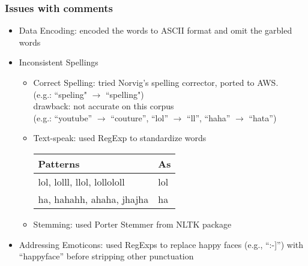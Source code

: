 \documentclass[fleqn]{beamer}
\begin{document}
\begin{frame}
\frametitle{Issues with comments}
    \begin{itemize}
   	\item Data Encoding: encoded the words to ASCII format and omit the garbled words
        \item Inconsistent Spellings 
        	\begin{itemize}
		\item Correct Spelling: tried Norvig's spelling corrector, ported to AWS. \\
		(e.g.: ``speling"  $\rightarrow$ ``spelling")\\
                drawback: not accurate on this corpus\\
                  (e.g.: ``youtube'' $\rightarrow$ ``couture'', 
                    ``lol'' $\rightarrow$ ``ll'', ``haha'' $\rightarrow$ ``hata'')
                   \item Text-speak:  used RegExp to standardize words\\
		\begin{center}
        			\begin{tabular}{ | l | l |}
			\hline
			Patterns & As \\ \hline
			lol, lolll, llol, lollololl & lol \\ \hline
			ha, hahahh, ahaha, jhajha & ha \\
			\hline
			\end{tabular}
					
      		\end{center}
		\item Stemming: used Porter Stemmer from NLTK package
	\end{itemize}
       
        \item Addressing Emoticons: used RegExps to replace happy faces (e.g., ``:-]'') with 
                ``happyface'' 
                  before stripping other punctuation

    \end{itemize}
\end{frame}
\end{document}
